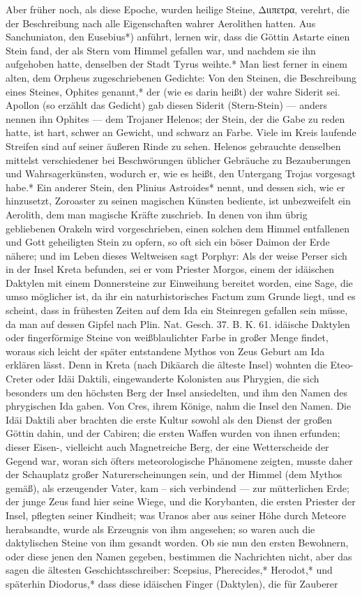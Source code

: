 \documentclass[a4paper, 11pt, oneside, polutonikogreek, german]{article}
\begin{document}
Aber früher noch, als diese Epoche, wurden heilige Steine, Διιπετρα, verehrt, die der Beschreibung nach alle Eigenschaften wahrer Aerolithen hatten. Aus Sanchuniaton, den Eusebius*) anführt, lernen wir, dass die Göttin Astarte einen Stein fand, der als Stern vom Himmel gefallen war, und nachdem sie ihn aufgehoben hatte, denselben der Stadt Tyrus weihte.* Man liest ferner in einem alten, dem Orpheus zugeschriebenen Gedichte: Von den Steinen, die Beschreibung eines Steines, Ophites genannt,* der (wie es darin heißt) der wahre Siderit sei. Apollon (so erzählt das Gedicht) gab diesen Siderit (Stern-Stein) --- anders nennen ihn Ophites --- dem Trojaner Helenos; der Stein, der die Gabe zu reden hatte, ist hart, schwer an Gewicht, und schwarz an Farbe. Viele im Kreis laufende Streifen sind auf seiner äußeren Rinde zu sehen. Helenos gebrauchte denselben mittelst verschiedener bei Beschwörungen üblicher Gebräuche zu Bezauberungen und Wahrsagerkünsten, wodurch er, wie es heißt, den Untergang Trojas vorgesagt habe.* Ein anderer Stein, den Plinius Astroides* nennt, und dessen sich, wie er hinzusetzt, Zoroaster zu seinen magischen Künsten bediente, ist unbezweifelt ein Aerolith, dem man magische Kräfte zuschrieb. In denen von ihm übrig gebliebenen Orakeln wird vorgeschrieben, einen solchen dem Himmel entfallenen und Gott geheiligten Stein zu opfern, so oft sich ein böser Daimon der Erde nähere; und im Leben dieses Weltweisen sagt Porphyr: Als der weise Perser sich in der Insel Kreta befunden, sei er vom Priester Morgos, einem der idäischen Daktylen mit einem Donnersteine zur Einweihung bereitet worden, eine Sage, die umso möglicher ist, da ihr ein naturhistorisches Factum zum Grunde liegt, und es scheint, dass in frühesten Zeiten auf dem Ida ein Steinregen gefallen sein müsse, da man auf dessen Gipfel nach Plin. Nat. Gesch. 37. B. K. 61. idäische Daktylen oder fingerförmige Steine von weißblaulichter Farbe in großer Menge findet, woraus sich leicht der später entstandene Mythos von Zeus Geburt am Ida erklären lässt. Denn in Kreta (nach Dikäarch die älteste Insel) wohnten die Eteo-Creter oder Idäi Daktili, eingewanderte Kolonisten aus Phrygien, die sich besonders um den höchsten Berg der Insel ansiedelten, und ihm den Namen des phrygischen Ida gaben. Von Cres, ihrem Könige, nahm die Insel den Namen. Die Idäi Daktili aber brachten die erste Kultur sowohl als den Dienst der großen Göttin dahin, und der Cabiren; die ersten Waffen wurden von ihnen erfunden; dieser Eisen-, vielleicht auch Magnetreiche Berg, der eine Wetterscheide der Gegend war, woran sich öfters meteorologische Phänomene zeigten, musste daher der Schauplatz großer Naturerscheinungen sein, und der Himmel (dem Mythos gemäß), als erzeugender Vater, kam -- sich verbindend --- zur mütterlichen Erde; der junge Zeus fand hier seine Wiege, und die Korybanten, die ersten Priester der Insel, pflegten seiner Kindheit; was Uranos aber aus seiner Höhe durch Meteore herabsandte, wurde als Erzeugnis von ihm angesehen; so waren auch die daktylischen Steine von ihm gesandt worden. Ob sie nun den ersten Bewohnern, oder diese jenen den Namen gegeben, bestimmen die Nachrichten nicht, aber das sagen die ältesten Geschichtsschreiber: Scepsius, Pherecides,* Herodot,* und späterhin Diodorus,* dass diese idäischen Finger (Daktylen), die für Zauberer 
\end{document}
